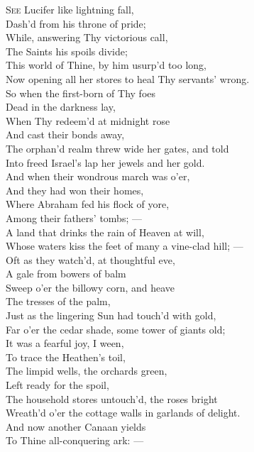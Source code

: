 \textsc{See} Lucifer like lightning fall, \\
 Dash’d from his throne of pride; \\
 While, answering Thy victorious call, \\
 The Saints his spoils divide; \\
 This world of Thine, by him usurp’d too long, \\
 Now opening all her stores to heal Thy servants’ wrong. \\
  So when the first-born of Thy foes \\
 Dead in the darkness lay, \\
 When Thy redeem’d at midnight rose \\
 And cast their bonds away, \\
 The orphan’d realm threw wide her gates, and told \\
 Into freed Israel’s lap her jewels and her gold. \\
  And when their wondrous march was o’er, \\
 And they had won their homes, \\
 Where Abraham fed his flock of yore, \\
 Among their fathers’ tombs; — \\
 A land that drinks the rain of Heaven at will, \\
 Whose waters kiss the feet of many a vine-clad hill; — \\
  Oft as they watch’d, at thoughtful eve, \\
 A gale from bowers of balm \\
 Sweep o’er the billowy corn, and heave \\
 The tresses of the palm, \\
 Just as the lingering Sun had touch’d with gold, \\
 Far o’er the cedar shade, some tower of giants old; \\
  It was a fearful joy, I ween, \\
 To trace the Heathen’s toil, \\
 The limpid wells, the orchards green, \\
 Left ready for the spoil, \\
 The household stores untouch’d, the roses bright \\
 Wreath’d o’er the cottage walls in garlands of delight. \\
  And now another Canaan yields \\
 To Thine all-conquering ark: — \\
